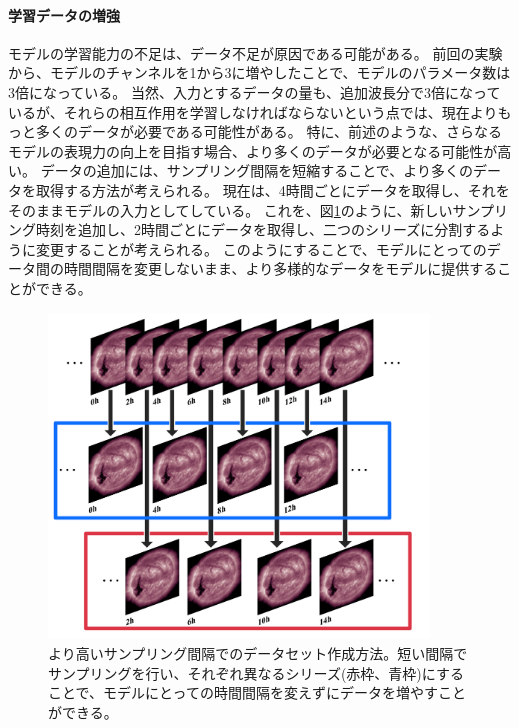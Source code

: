         \paragraph{学習データの増強}
          モデルの学習能力の不足は、データ不足が原因である可能がある。
          前回の実験から、モデルのチャンネルを1から3に増やしたことで、モデルのパラメータ数は3倍になっている。
          当然、入力とするデータの量も、追加波長分で3倍になっているが、それらの相互作用を学習しなければならないという点では、現在よりもっと多くのデータが必要である可能性がある。
          特に、前述のような、さらなるモデルの表現力の向上を目指す場合、より多くのデータが必要となる可能性が高い。
          データの追加には、サンプリング間隔を短縮することで、より多くのデータを取得する方法が考えられる。
          現在は、4時間ごとにデータを取得し、それをそのままモデルの入力としてしている。
          これを、図\ref{fig:exp2_data_sampling_new}のように、新しいサンプリング時刻を追加し、2時間ごとにデータを取得し、二つのシリーズに分割するように変更することが考えられる。
          このようにすることで、モデルにとってのデータ間の時間間隔を変更しないまま、より多様的なデータをモデルに提供することができる。
          \begin{figure}[htbp]
            \centering
            \includegraphics[width=0.9\textwidth]{figures/exp2/exp2_new_dataset.jpg}
            \caption{より高いサンプリング間隔でのデータセット作成方法。短い間隔でサンプリングを行い、それぞれ異なるシリーズ(赤枠、青枠)にすることで、モデルにとっての時間間隔を変えずにデータを増やすことができる。}
            \label{fig:exp2_data_sampling_new}
          \end{figure}
        
    
    
